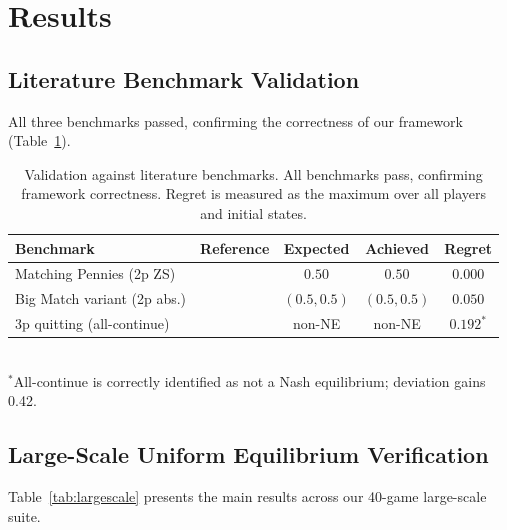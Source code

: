 \documentclass[11pt,a4paper]{article}
\theoremstyle{definition}
\begin{document}
\section{Results}\label{sec:results}

\subsection{Literature Benchmark Validation}

All three benchmarks passed, confirming the correctness of our framework (Table~\ref{tab:benchmarks}).

\begin{table}[t]
\centering
\caption{Validation against literature benchmarks. All benchmarks pass, confirming framework correctness. Regret is measured as the maximum over all players and initial states.}\label{tab:benchmarks}
\begin{tabular}{@{}llccc@{}}
\toprule
\textbf{Benchmark} & \textbf{Reference} & \textbf{Expected} & \textbf{Achieved} & \textbf{Regret} \\
\midrule
Matching Pennies (2p ZS) & \citet{shapley1953stochastic} & $0.50$ & $0.50$ & $\mathbf{0.000}$ \\
Big Match variant (2p abs.) & \citet{vieille2000a} & $(0.5, 0.5)$ & $(0.5, 0.5)$ & $\mathbf{0.050}$ \\
3p quitting (all-continue) & \citet{solan1999three} & non-NE & non-NE & $0.192^*$ \\
\bottomrule
\end{tabular}
\\[4pt]
{\footnotesize $^*$All-continue is correctly identified as not a Nash equilibrium; deviation gains 0.42.}
\end{table}

\subsection{Large-Scale Uniform Equilibrium Verification}

Table~\ref{tab:largescale} presents the main results across our 40-game large-scale suite.
\end{document}
